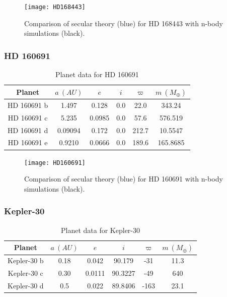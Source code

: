 \documentclass[11pt, oneside]{article}   	%
\begin{document}
\begin{figure}[!h]
\begin{center}
\texttt{[image: HD168443]}
\caption[]{Comparison of secular theory (blue) for HD 168443 with n-body simulations (black).}
\label{}
\end{center}
\end{figure}

\newpage

\subsubsection{HD 160691}

\begin{table}[!h]
\centering
\small
\label{my-label}
\begin{tabular}{|c|c|c|c|c|c|}
\hline
\rowcolor[HTML]{C0C0C0} 
Planet & $a \ (AU)$       & $e$     & $i$   & $\varpi$  & $m \ (M _{\oplus})$ \\ \hline
HD 160691 b    & 1.497   & 0.128  & 0.0 & 22.0  & 343.24   \\ \hline
HD 160691 c    & 5.235   & 0.0985 & 0.0 & 57.6  & 576.519  \\ \hline
HD 160691 d    & 0.09094 & 0.172  & 0.0 & 212.7 & 10.5547  \\ \hline
HD 160691 e    & 0.9210  & 0.0666 & 0.0 & 189.6 & 165.8685 \\ \hline
\end{tabular}
\caption{Planet data for HD 160691}
\end{table}

\begin{figure}[!h]
\begin{center}
\texttt{[image: HD160691]}
\caption[]{Comparison of secular theory (blue) for HD 160691 with n-body simulations (black).}
\label{}
\end{center}
\end{figure}

\newpage


\subsubsection{Kepler-30}

\begin{table}[!h]
\centering
\small
\label{my-label}
\begin{tabular}{|c|c|c|c|c|c|}
\hline
\rowcolor[HTML]{C0C0C0} 
Planet & $a \ (AU)$       & $e$     & $i$   & $\varpi$  & $m \ (M _{\oplus})$ \\ \hline
Kepler-30 b    & 0.18 & 0.042  & 90.179  & -31  & 11.3 \\ \hline
Kepler-30 c    & 0.30 & 0.0111 & 90.3227 & -49  & 640  \\ \hline
Kepler-30 d    & 0.5  & 0.022  & 89.8406 & -163 & 23.1 \\ \hline
\end{tabular}
\caption{Planet data for Kepler-30}
\end{table}
\end{document}
